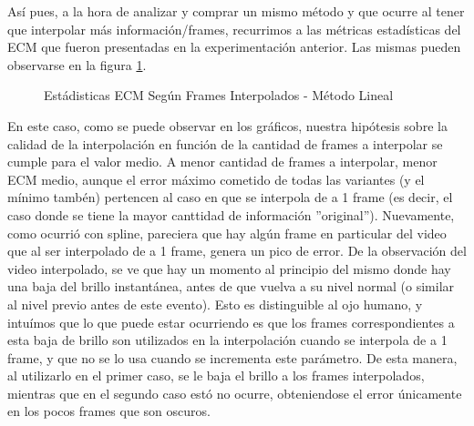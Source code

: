 \par As\'i pues, a la hora de analizar y comprar un mismo m\'etodo y que ocurre
al tener que interpolar m\'as informaci\'on/frames, recurrimos a las m\'etricas
estad\'isticas del ECM que fueron presentadas en la experimentaci\'on anterior.
Las mismas pueden observarse en la figura
\ref{fig:fija-fija_lineal-mse_estadisticas}.

\begin{figure}[H]
    \centering
    \caption{Est\'adisticas ECM Seg\'un Frames Interpolados - M\'etodo Lineal}
    \label{fig:fija-fija_lineal-mse_estadisticas}
\end{figure}

\par En este caso, como se puede observar en los gr\'aficos, nuestra
hip\'otesis sobre la calidad de la interpolaci\'on en funci\'on de la cantidad
de frames a interpolar se cumple para el valor medio. A menor cantidad de
frames a interpolar, menor ECM medio, aunque el error m\'aximo cometido de
todas las variantes (y el m\'inimo tamb\'en) pertencen al caso en que se
interpola de a 1 frame (es decir, el caso donde se tiene la mayor canttidad de
informaci\'on ''original''). Nuevamente, como ocurri\'o con spline, pareciera
que hay alg\'un frame en particular del video que al ser interpolado de a 1
frame, genera un pico de error. De la observaci\'on del video interpolado, se
ve que hay un momento al principio del mismo donde hay una baja del brillo
instant\'anea, antes de que vuelva a su nivel normal (o similar al nivel previo
antes de este evento). Esto es distinguible al ojo humano, y intu\'imos que lo
que puede estar ocurriendo es que los frames correspondientes a esta baja de
brillo son utilizados en la interpolaci\'on cuando se interpola de a 1 frame, y
que no se lo usa cuando se incrementa este par\'ametro. De esta manera, al
utilizarlo en el primer caso, se le baja el brillo a los frames interpolados,
mientras que en el segundo caso est\'o no ocurre, obteniendose el error
\'unicamente en los pocos frames que son oscuros.

